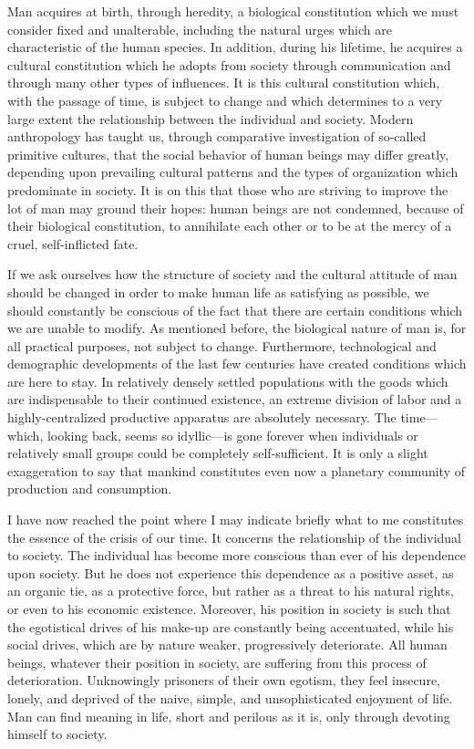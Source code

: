 \documentclass[12pt]{article}
\begin{document}
Man acquires at birth, through heredity, a biological constitution which we must consider fixed and unalterable, including the natural urges which are characteristic of the human species. In addition, during his lifetime, he acquires a cultural constitution which he adopts from society through communication and through many other types of influences. It is this cultural constitution which, with the passage of time, is subject to change and which determines to a very large extent the relationship between the individual and society. Modern anthropology has taught us, through comparative investigation of so-called primitive cultures, that the social behavior of human beings may differ greatly, depending upon prevailing cultural patterns and the types of organization which predominate in society. It is on this that those who are striving to improve the lot of man may ground their hopes: human beings are not condemned, because of their biological constitution, to annihilate each other or to be at the mercy of a cruel, self-inflicted fate.

If we ask ourselves how the structure of society and the cultural attitude of man should be changed in order to make human life as satisfying as possible, we should constantly be conscious of the fact that there are certain conditions which we are unable to modify. As mentioned before, the biological nature of man is, for all practical purposes, not subject to change. Furthermore, technological and demographic developments of the last few centuries have created conditions which are here to stay. In relatively densely settled populations with the goods which are indispensable to their continued existence, an extreme division of labor and a highly-centralized productive apparatus are absolutely necessary. The time—which, looking back, seems so idyllic—is gone forever when individuals or relatively small groups could be completely self-sufficient. It is only a slight exaggeration to say that mankind constitutes even now a planetary community of production and consumption.

I have now reached the point where I may indicate briefly what to me constitutes the essence of the crisis of our time. It concerns the relationship of the individual to society. The individual has become more conscious than ever of his dependence upon society. But he does not experience this dependence as a positive asset, as an organic tie, as a protective force, but rather as a threat to his natural rights, or even to his economic existence. Moreover, his position in society is such that the egotistical drives of his make-up are constantly being accentuated, while his social drives, which are by nature weaker, progressively deteriorate. All human beings, whatever their position in society, are suffering from this process of deterioration. Unknowingly prisoners of their own egotism, they feel insecure, lonely, and deprived of the naive, simple, and unsophisticated enjoyment of life. Man can find meaning in life, short and perilous as it is, only through devoting himself to society.
\end{document}

